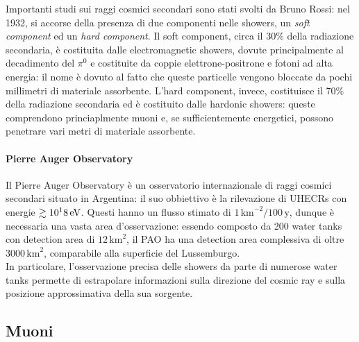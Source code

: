 Importanti studi sui raggi cosmici secondari sono stati svolti da Bruno Rossi: nel 1932, si accorse della presenza di due componenti nelle showers, un \textit{soft component} ed un \textit{hard component}. Il soft component, circa il 30\% della radiazione secondaria, è costituita dalle electromagnetic showers, dovute principalmente al decadimento del $ \pi^0 $ e costituite da coppie elettrone-positrone e fotoni ad alta energia: il nome è dovuto al fatto che queste particelle vengono bloccate da pochi millimetri di materiale assorbente. L'hard component, invece, costituisce il 70\% della radiazione secondaria ed è costituito dalle hardonic showers: queste comprendono princiaplmente muoni e, se sufficientemente energetici, possono penetrare vari metri di materiale assorbente.

\paragraph{Pierre Auger Observatory}

Il Pierre Auger Observatory è un osservatorio internazionale di raggi cosmici secondari situato in Argentina: il suo obbiettivo è la rilevazione di UHECRs con energie $ \gtrsim 10^18\,\mathrm{eV} $. Questi hanno un flusso stimato di $ 1\,\text{km}^{-2} / 100\,\text{y} $, dunque è necessaria una vasta area d'osservazione: essendo composto da 200 water tanks con detection area di $ 12\,\text{km}^2 $, il PAO ha una detection area complessiva di oltre $ 3000\,\text{km}^2 $, comparabile alla superficie del Lussemburgo.\\
In particolare, l'osservazione precisa delle showers da parte di numerose water tanks permette di estrapolare informazioni sulla direzione del cosmic ray e sulla posizione approssimativa della sua sorgente.

\subsection{Muoni}

